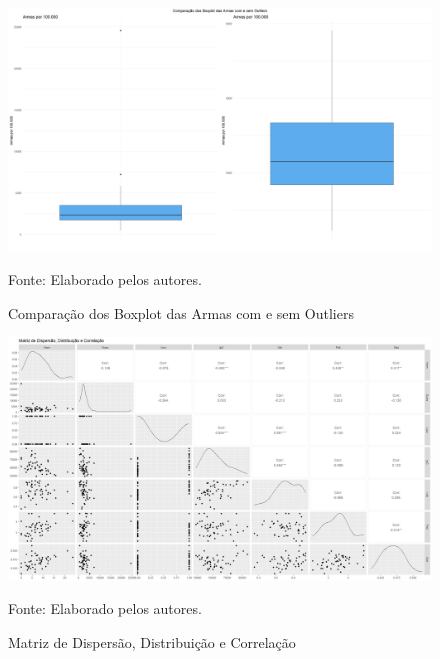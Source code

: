 \documentclass[12pt]{article}
\begin{document}
\begin{figure}[H]
    \centering
    \caption{Comparação dos Boxplot das Armas com e sem Outliers}
    \includegraphics[width=1.0\textwidth]{Boxplot dos Dados sem Outlier.png}
    \label{fig:Boxplot dos Dados sem Outlier}
    
    \footnotesize{Fonte: Elaborado pelos autores.}
\end{figure}


\begin{figure}[H]
    \centering
    \caption{Matriz de Dispersão, Distribuição e Correlação}
    \includegraphics[width=1.0\textwidth]{Matriz de Dispersão, Distribuição e Correlação.png}
    \label{fig:Matriz de Dispersão, Distribuição e Correlação}
    
    \footnotesize{Fonte: Elaborado pelos autores.}
\end{figure}
\end{document}
